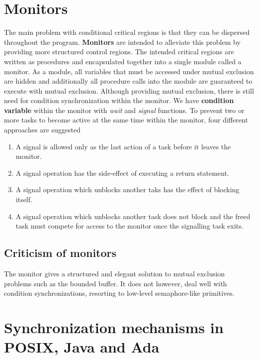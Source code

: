 \section{Monitors}
The main problem with conditional critical regions is that they can be dispersed throughout the program. \textbf{Monitors} are intended to alleviate this problem by providing more structured control regions. The intended critical regions are written as procedures and encapsulated together into a single module called a monitor. As a module, all variables that must be accessed under mutual exclusion are hidden and additionally all procedure calls into the module are guaranteed to execute with mutual exclusion. Although providing mutual exclusion, there is still need for condition synchronization within the monitor. We have \textbf{condition variable} within the monitor with \textit{wait} and \textit{signal} functions. To prevent two or more tasks to become active at the same time within the monitor, four different approaches are suggested
\begin{enumerate}
\item A signal is allowed only as the last action of a task before it leaves the monitor.
\item A signal operation has the side-effect of executing a return statement.
\item A signal operation which unblocks another taks has the effect of blocking itself.
\item A signal operation which unblocks another task does not block and the freed task must compete for access to the monitor once the signalling task exits.
\end{enumerate}

\subsection{Criticism of monitors}
The monitor gives a structured and elegant solution to mutual exclusion problems such as the bounded buffer. It does not however, deal well with condition synchronizations, resorting to low-level semaphore-like primitives. 

\section{Synchronization mechanisms in POSIX, Java and Ada}
